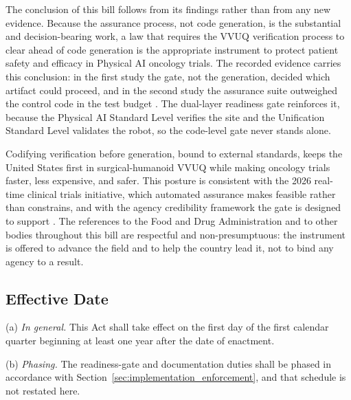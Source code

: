 
The conclusion of this bill follows from its findings rather than from any new
evidence. Because the assurance process, not code generation, is the substantial
and decision-bearing work, a law that requires the VVUQ verification process to
clear ahead of code generation is the appropriate instrument to protect patient
safety and efficacy in Physical AI oncology trials. The recorded evidence carries
this conclusion: in the first study the gate, not the generation, decided which
artifact could proceed, and in the second study the assurance suite outweighed
the control code in the test budget \cite{kawchak2026vvuq01, kawchak2026vvuq02}.
The dual-layer readiness gate reinforces it, because the Physical AI Standard
Level verifies the site and the Unification Standard Level validates the robot,
so the code-level gate never stands alone.

Codifying verification before generation, bound to external standards, keeps the
United States first in surgical-humanoid VVUQ while making oncology trials faster,
less expensive, and safer. This posture is consistent with the 2026 real-time
clinical trials initiative, which automated assurance makes feasible rather than
constrains, and with the agency credibility framework the gate is designed to
support \cite{fda2026realtime, fda2023credibility}. The references to the Food and
Drug Administration and to other bodies throughout this bill are respectful and
non-presumptuous: the instrument is offered to advance the field and to help the
country lead it, not to bind any agency to a result.

\subsection{Effective Date}

(a) \textit{In general.} This Act shall take effect on the first day of the first
calendar quarter beginning at least one year after the date of enactment.

(b) \textit{Phasing.} The readiness-gate and documentation duties shall be phased
in accordance with Section~\ref{sec:implementation_enforcement}, and that
schedule is not restated here.
